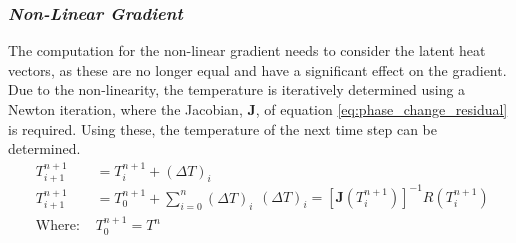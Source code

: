   \subsubsection*{\emph{Non-Linear Gradient}}
  The computation for the non-linear gradient needs to consider the latent heat vectors, as these are no longer equal and have a significant effect on the gradient. Due to the non-linearity, the temperature is iteratively determined using a Newton iteration, where the Jacobian, $\mathbf{J}$, of equation \ref{eq:phase_change_residual} is required. Using these, the temperature of the next time step can be determined.
  \begin{subequations}
    \begin{equation}
      \begin{split}
        T^{n+1}_{i+1} &= T^{n+1}_{i} + (\Delta T)_i \\
        T^{n+1}_{i+1} &= T^{n+1}_{0} + \sum_{i=0}^n (\Delta T)_i \\
        \text{Where: }& T_0^{n+1} = T^n
      \end{split}
    \end{equation}
    \begin{equation}
      (\Delta T)_i = [\mathbf{J} (T^{n+1}_{i})]^{-1} R(T^{n+1}_{i})
    \end{equation}
    \label{eq:new_temperature_sum}
  \end{subequations}
  
